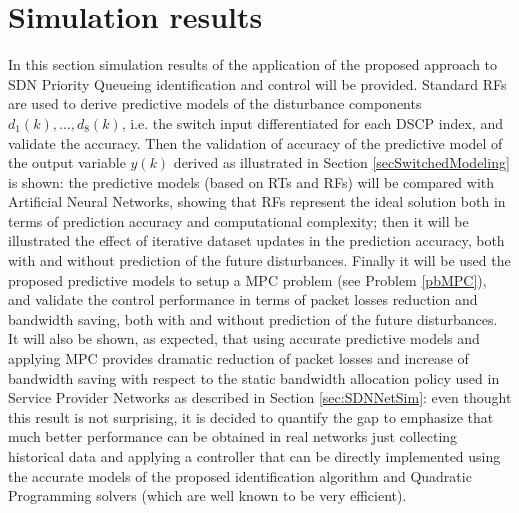 \chapter{Simulation results}\label{secExpRes}
In this section simulation results of the application of the proposed approach to SDN Priority Queueing identification and control will be provided. Standard RFs are used to derive predictive models of the disturbance components $d_1(k),\ldots,d_8(k)$, i.e. the switch input differentiated for each DSCP index, and validate the accuracy. Then the validation of accuracy of the predictive model of the output variable $y(k)$ derived as illustrated in Section \ref{secSwitchedModeling} is shown: the predictive models (based on RTs and RFs) will be compared with Artificial Neural Networks, showing that RFs represent the ideal solution both in terms of prediction accuracy and computational complexity; then it will be illustrated the effect of iterative dataset updates in the prediction accuracy, both with and without prediction of the future disturbances. Finally it will be used the proposed predictive models to setup a MPC problem (see Problem \ref{pbMPC}), and validate the control performance in terms of packet losses reduction and bandwidth saving, both with and without prediction of the future disturbances. It will also be shown, as expected, that using accurate predictive models and applying MPC provides dramatic reduction of packet losses and increase of bandwidth saving with respect to the static bandwidth allocation policy used in Service Provider Networks as described in Section \ref{sec:SDNNetSim}: even thought this result is not surprising, it is decided to quantify the gap to emphasize that much better performance can be obtained in real networks just collecting historical data and applying a controller that can be directly implemented using the accurate models of the proposed identification algorithm and Quadratic Programming solvers (which are well known to be very efficient).

